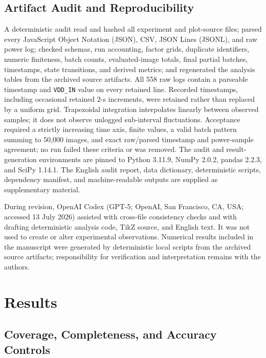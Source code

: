 \documentclass[electronics,article,submit,pdftex,moreauthors]{Definitions/mdpi}
\begin{document}
\subsection{Artifact Audit and Reproducibility}

A deterministic audit read and hashed all experiment and plot-source files; parsed every JavaScript Object Notation (JSON), CSV, JSON Lines (JSONL), and raw power log; checked schemas, run accounting, factor grids, duplicate identifiers, numeric finiteness, batch counts, evaluated-image totals, final partial batches, timestamps, state transitions, and derived metrics; and regenerated the analysis tables from the archived source artifacts. All 558 raw logs contain a parseable timestamp and \texttt{VDD\_IN} value on every retained line. Recorded timestamps, including occasional retained 2-s increments, were retained rather than replaced by a uniform grid. Trapezoidal integration interpolates linearly between observed samples; it does not observe unlogged sub-interval fluctuations. Acceptance required a strictly increasing time axis, finite values, a valid batch pattern summing to 50,000 images, and exact raw/parsed timestamp and power-sample agreement; no run failed these criteria or was removed. The audit and result-generation environments are pinned to Python 3.11.9, NumPy 2.0.2, pandas 2.2.3, and SciPy 1.14.1. The English audit report, data dictionary, deterministic scripts, dependency manifest, and machine-readable outputs are supplied as supplementary material.

During revision, OpenAI Codex (GPT-5; OpenAI, San Francisco, CA, USA; accessed 13 July 2026) assisted with cross-file consistency checks and with drafting deterministic analysis code, TikZ source, and English text. It was not used to create or alter experimental observations. Numerical results included in the manuscript were generated by deterministic local scripts from the archived source artifacts; responsibility for verification and interpretation remains with the authors.

\section{Results}

\subsection{Coverage, Completeness, and Accuracy Controls}
\end{document}
